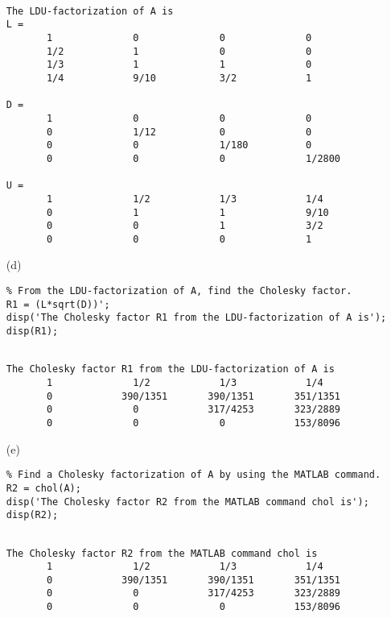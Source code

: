 \begin{exer}
\begin{sol}
\begin{enumerate}
\begin{verbatim}
\end{verbatim}


\begin{outputs}
\begin{verbatim}

The LDU-factorization of A is
L =
       1              0              0              0
       1/2            1              0              0
       1/3            1              1              0
       1/4            9/10           3/2            1

D =
       1              0              0              0
       0              1/12           0              0
       0              0              1/180          0
       0              0              0              1/2800

U =
       1              1/2            1/3            1/4
       0              1              1              9/10
       0              0              1              3/2
       0              0              0              1
\end{verbatim}
\end{outputs}


\item[(d)]
\begin{verbatim}
% From the LDU-factorization of A, find the Cholesky factor.
R1 = (L*sqrt(D))';
disp('The Cholesky factor R1 from the LDU-factorization of A is'); 
disp(R1);
\end{verbatim}

\begin{outputs}
\begin{verbatim}

The Cholesky factor R1 from the LDU-factorization of A is
       1              1/2            1/3            1/4
       0            390/1351       390/1351       351/1351
       0              0            317/4253       323/2889
       0              0              0            153/8096
\end{verbatim}
\end{outputs}


\item[(e)]
\begin{verbatim}
% Find a Cholesky factorization of A by using the MATLAB command.
R2 = chol(A);
disp('The Cholesky factor R2 from the MATLAB command chol is'); 
disp(R2);
\end{verbatim}


\begin{outputs}
\begin{verbatim}

The Cholesky factor R2 from the MATLAB command chol is
       1              1/2            1/3            1/4
       0            390/1351       390/1351       351/1351
       0              0            317/4253       323/2889
       0              0              0            153/8096
\end{verbatim}
\end{outputs}
\end{enumerate}
\end{sol}

\end{exer}


